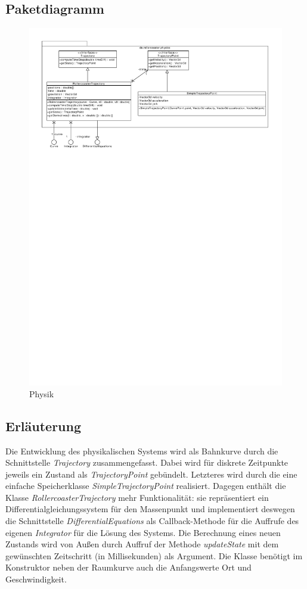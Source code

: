 \subsection{Paketdiagramm}
\begin{figure}
\includegraphics[width=\linewidth]{bilder/Physics}
\caption{Physik}
\end{figure}

\subsection{Erläuterung}

Die Entwicklung des physikalischen Systems wird als Bahnkurve durch die Schnittstelle
\emph{Trajectory} zusammengefasst. Dabei wird für diskrete Zeitpunkte jeweils ein
Zustand als \emph{TrajectoryPoint} gebündelt. Letzteres wird durch die eine
einfache Speicherklasse  \emph{SimpleTrajectoryPoint} realisiert.
Dagegen enthält die Klasse \emph{RollercoasterTrajectory} mehr Funktionalität: sie
repräsentiert ein Differentialgleichungssystem für den Massenpunkt und implementiert
deswegen die Schnittstelle \emph{DifferentialEquations} als Callback-Methode für
die Auffrufe des eigenen \emph{Integrator} für die Lösung des Systems. Die Berechnung
eines neuen Zustands wird von Außen durch Auffruf der Methode \emph{updateState} mit
dem gewünschten Zeitschritt (in Millisekunden) als Argument. Die Klasse benötigt im 
Konstruktor neben der Raumkurve auch die Anfangswerte Ort und Geschwindigkeit.

